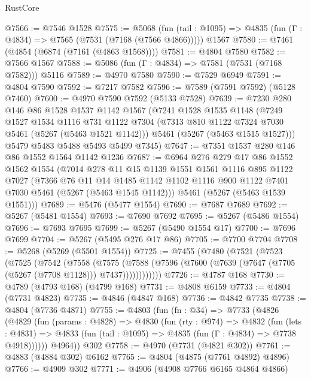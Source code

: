 \begin{lexlean}{RustCore}
\begin{coremodule}
@7566 := @7546 @1528
@7575 := @5068
    (fun (tail : @1095) => @4835 (fun (Γ : @4834) => @7565 (@7531 (@7168 (@7566 @4866)))))
    @1567
@7580 := @7461 (@4854 (@6874 (@7161 (@4863 @1568))))
@7581 := @4804 @7580
@7582 := @7566 @1567
@7588 := @5086 (fun (Γ : @4834) => @7581 (@7531 (@7168 @7582))) @5116
@7589 := @4970 @7580
@7590 := @7529 @6949
@7591 := @4804 @7590
@7592 := @7217 @7582
@7596 := @7589 (@7591 @7592) (@5128 @7460)
@7600 := @4970 @7590 @7592 (@5133 @7528)
@7639 := @7230
    @280
    @146
    @86
    @1528
    @1537
    @1142
    @1567
    (@7241
      @1528
      @1535
      @1148
      (@7249
        @1527
        @1534
        @1116
        @731
        @1122
        @7304
        (@7313 @810 @1122 @7324 @7030 @5461 (@5267 (@5463 @1521 @1142)))
        @5461
        (@5267 (@5463 @1515 @1527)))
      @5479
      @5483
      @5488
      @5493
      @5499
      @7345)
@7647 := @7351 @1537 @280 @146 @86 @1552 @1564 @1142 @1236
@7687 := @6964
    @276
    @279
    @17
    @86
    @1552
    @1562
    @1554
    (@7014
      @278
      @11
      @15
      @1139
      @1551
      @1561
      @1116
      @895
      @1122
      @7027
      (@7366
        @76
        @11
        @14
        @1485
        @1142
        @1102
        @1116
        @900
        @1122
        @7401
        @7030
        @5461
        (@5267 (@5463 @1545 @1142)))
      @5461
      (@5267 (@5463 @1539 @1551)))
@7689 := @5476 (@5477 @1554)
@7690 := @7687 @7689
@7692 := @5267 (@5481 @1554)
@7693 := @7690 @7692
@7695 := @5267 (@5486 @1554)
@7696 := @7693 @7695
@7699 := @5267 (@5490 @1554 @17)
@7700 := @7696 @7699
@7704 := @5267 (@5495 @276 @17 @86)
@7705 := @7700 @7704
@7708 := @5268 (@5269 (@5501 @1554))
@7725 := @7455
    (@7480
      (@7521
        (@7523
          (@7525
            (@7542
              (@7558
                (@7575
                  (@7588 (@7596 (@7600 (@7639 (@7647 (@7705 (@5267 (@7708 @1128))) @7437))))))))))))
@7726 := @4787 @168
@7730 := @4789 (@4793 @168) (@4799 @168)
@7731 := @4808 @6159
@7733 := @4804 (@7731 @4823)
@7735 := @4846 (@4847 @168)
@7736 := @4842 @7735
@7738 := @4804 (@7736 @4871)
@7755 := @4803
    (fun (fn : @34) =>
    @7733
      (@4826
        (@4829
          (fun (params : @4828) =>
          @4830
            (fun (rty : @974) =>
            @4832
              (fun (lets : @4831) =>
              @4833 (fun (tail : @1095) => @4835 (fun (Γ : @4834) => @7738 @4918))))))
        @4964))
    @302
@7758 := @4970 (@7731 (@4821 @302))
@7761 := @4883 (@4884 @302) @6162
@7765 := @4804 (@4875 (@7761 @4892) @4896)
@7766 := @4909 @302
@7771 := @4906 (@4908 @7766 @6165 @4864 @4866)

\end{coremodule}
\end{lexlean}
